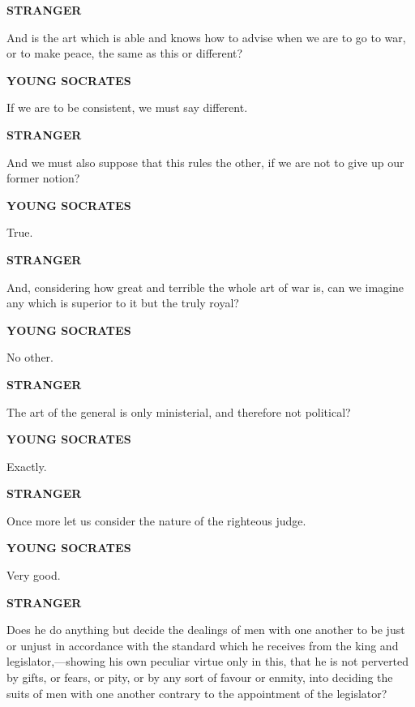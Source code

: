 \documentclass[11pt,letter]{article}
\begin{document}
\par \textbf{STRANGER}
\par   And is the art which is able and knows how to advise when we are to go to war, or to make peace, the same as this or different?

\par \textbf{YOUNG SOCRATES}
\par   If we are to be consistent, we must say different.

\par \textbf{STRANGER}
\par   And we must also suppose that this rules the other, if we are not to give up our former notion?

\par \textbf{YOUNG SOCRATES}
\par   True.

\par \textbf{STRANGER}
\par   And, considering how great and terrible the whole art of war is, can we imagine any which is superior to it but the truly royal?

\par \textbf{YOUNG SOCRATES}
\par   No other.

\par \textbf{STRANGER}
\par   The art of the general is only ministerial, and therefore not political?

\par \textbf{YOUNG SOCRATES}
\par   Exactly.

\par \textbf{STRANGER}
\par   Once more let us consider the nature of the righteous judge.

\par \textbf{YOUNG SOCRATES}
\par   Very good.

\par \textbf{STRANGER}
\par   Does he do anything but decide the dealings of men with one another to be just or unjust in accordance with the standard which he receives from the king and legislator,—showing his own peculiar virtue only in this, that he is not perverted by gifts, or fears, or pity, or by any sort of favour or enmity, into deciding the suits of men with one another contrary to the appointment of the legislator?
\end{document}
